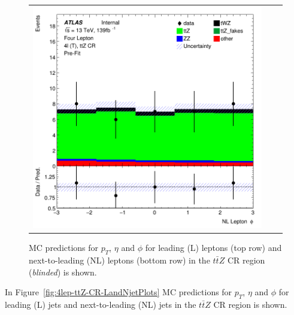 \begin{figure}[htbp]
\begin{tabular}{ccc}
    \includegraphics[width=.3\textwidth]{figures/PreFitPlots/lep4_ttZ_4T_NL_lepton_phi.png} \\

  \end{tabular}
    \caption{MC predictions for $p_{T}$, $\eta$ and $\phi$ for leading (L) leptons (top row) and next-to-leading (NL) leptons (bottom row) in the $t\bar{t}Z$ CR region (\textit{blinded}) is shown.}
  \label{fig:4lep-ttZ-CR-leptonPlots}
\end{figure}

In Figure~\ref{fig:4lep-ttZ-CR-LandNjetPlots} MC predictions for $p_{T}$, $\eta$ and $\phi$ for leading (L) jets and next-to-leading (NL) jets in the $t\bar{t}Z$ CR region is shown.


